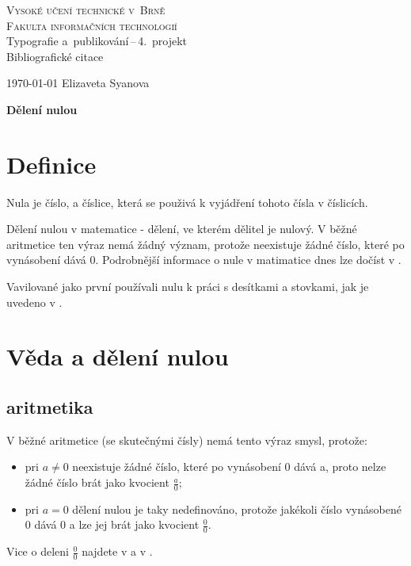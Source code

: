 \documentclass[a4paper, 11pt]{article}
\begin{document}
	\begin{titlepage}
		\begin{center}
			\Huge
			\textsc{Vysoké učení technické v~Brně} \\
			\huge
			\textsc{Fakulta informačních technologií} \\
			\LARGE
			Typografie a~publikování\,--\,4.~projekt \\
			\Huge
			Bibliografické citace
		\end{center}

		{\Large
			\today
			\hfill
			Elizaveta Syanova
		}
	\end{titlepage}
	
	
	\textbf{\LARGE Dělení nulou}

	\section{Definice}
	
	Nula je číslo, a číslice, která se použivá k vyjádření tohoto čísla v číslicích.
	
	Dělení nulou v matematice - dělení, ve kterém dělitel je nulový. 
	V běžné aritmetice ten výraz nemá žádný význam, protože neexistuje žádné číslo, které po vynásobení dává 0. Podrobnější informace o nule v matimatice dnes lze dočíst v \cite{jonasova}.
	
	Vavilované jako první používali nulu k práci s desítkami a stovkami, jak je uvedeno v \cite{babalao}.

	\section{Věda a dělení nulou}


	\subsection{aritmetika}
	
	V běžné aritmetice (se skutečnými čísly) nemá tento výraz smysl, protože:
	
	\begin{itemize}
	    \item pri $a\neq 0$ neexistuje žádné číslo, které po vynásobení 0 dává a, proto nelze žádné číslo brát jako kvocient $\frac{a}{0}$;
	    \item pri $a = 0$ dělení nulou je taky nedefinováno, protože jakékoli číslo vynásobené 0 dává 0 a lze jej brát jako kvocient $\frac{0}{0}$.
	\end{itemize}
    Vice o deleni $\frac{0}{0}$ najdete v \cite{barukcic} a v \cite{seife}.
\end{document}
